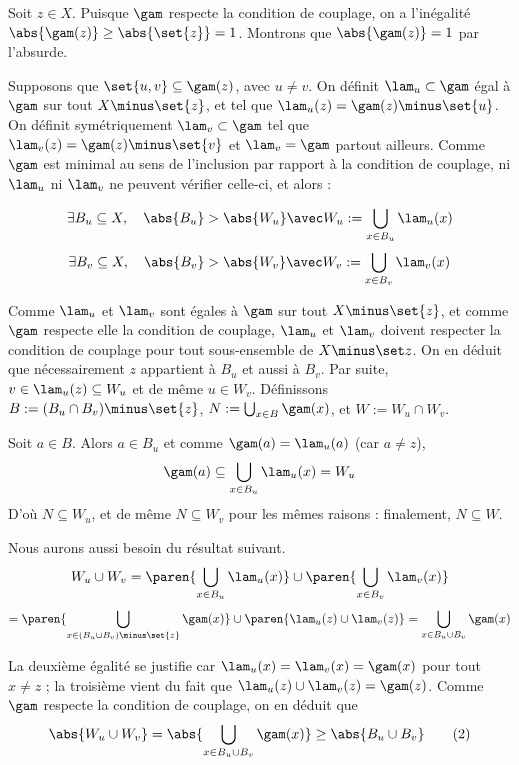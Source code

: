     Soit $z \in X$. Puisque $\gam$ respecte la condition de couplage, on a l'inégalité $\abs {\gam(z)} \geq \abs{\set{z}} = 1$.   Montrons que $\abs{\gam(z)} = 1$ par l'absurde.
    
    Supposons que $\set{u,v} \subseteq \gam(z)$, avec $u \neq v$. On définit $\lam_u \subset \gam$ égal à $\gam$ sur tout $X \minus \set{z}$, et tel que $\lam_u(z) = \gam(z) \minus \set{u}$. On définit symétriquement $\lam_v \subset \gam$ tel que $\lam_v(z) = \gam(z) \minus \set{v}$ et $\lam_v = \gam$ partout ailleurs. Comme $\gam$ est minimal au sens de l'inclusion par rapport à la condition de couplage, ni $\lam_u$ ni $\lam_v$ ne peuvent vérifier celle-ci, et alors :
    
    \[ \exists B_u \subseteq X, \quad \abs{B_u} > \abs{W_u} \avec W_u := \bigcup_{x \in B_u} \lam_u(x) \]
    \[ \exists B_v \subseteq X, \quad \abs{B_v} > \abs{W_v} \avec W_v := \bigcup_{x \in B_v} \lam_v(x) \]
    
    Comme $\lam_u$ et $\lam_v$ sont égales à $\gam$ sur tout $X \minus \set{z}$, et comme $\gam$ respecte elle la condition de couplage, $\lam_u$ et $\lam_v$ doivent respecter la condition de couplage pour tout sous-ensemble de $X \minus \set z$. On en déduit que nécessairement $z$ appartient à $B_u$ et aussi à $B_v$. Par suite, $v \in \lam_u(z) \subseteq W_u $ et de même $u \in W_v$. Définissons $B := (B_u \cap B_v) \minus \set{z}$, $N := \bigcup _{x \in B} \gam (x)$, et $W := W_u \cap W_v$.
    
    Soit $a \in B$. Alors $a \in B_u$ et comme $\gam(a) = \lam_u(a)$ (car $a \neq z$),
    \[ \gam(a) \subseteq  \bigcup_{x \in B_u} \lam_u(x) = W_u \]
    D'où $N \subseteq W_u$, et de même $N \subseteq W_v$ pour les mêmes raisons : finalement, $N \subseteq W$.
    
    Nous aurons aussi besoin du résultat suivant.
    \[ W_u \cup W_v = \paren { \bigcup_{x \in B_u} \lam_u(x) } \cup \paren{ \bigcup_{x \in B_v} \lam_v(x) }
    \]
    \[ = \paren{ \bigcup_{x \in (B_u \cup B_v) \minus \set{z} } \gam(x) } \cup \paren { \lam_u(z) \cup \lam_v(z) }
    = \bigcup_{x \in B_u \cup B_v } \gam(x) \]
    
    La deuxième égalité se justifie car $\lam_u(x) = \lam_v(x) = \gam(x)$ pour tout $x \neq z$ ; la troisième vient du fait que $\lam_u(z) \cup \lam_v(z) = \gam(z)$. Comme $\gam$ respecte la condition de couplage, on en déduit que
    \[ \abs{W_u \cup W_v} = \abs{\bigcup_{x \in B_u \cup B_v } \gam(x)} \geq \abs{B_u \cup B_v} \tag{2} \]
    
